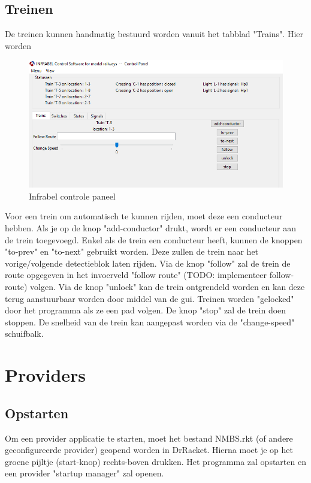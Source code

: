 \documentclass[a4paper, 11pt]{article}
\newcommand{\<}{\scriptsize\textless\normalsize}
\renewcommand{\>}{\scriptsize\textgreater\normalsize}
\begin{document}
\subsection{Treinen} %
De treinen kunnen handmatig bestuurd worden vanuit het tabblad "Trains". Hier worden
\begin{figure}[h]
	\begin{center}
		\includegraphics[scale=.75]{Bestanden/infrabel-train.png}
		\caption{Infrabel controle paneel}
	\end{center}
\end{figure}

Voor een trein om automatisch te kunnen rijden, moet deze een conducteur hebben. Als je op de knop "add-conductor" drukt, wordt er een conducteur aan de trein toegevoegd.
Enkel als de trein een conducteur heeft, kunnen de knoppen "to-prev" en "to-next" gebruikt worden. Deze zullen de trein naar het vorige/volgende detectieblok laten rijden.
Via de knop "follow" zal de trein de route opgegeven in het invoerveld "follow route" (TODO: implementeer follow-route) volgen.
Via de knop "unlock" kan de trein ontgrendeld worden en kan deze terug aanstuurbaar worden door middel van de gui. Treinen worden "gelocked" door het programma als ze een pad volgen.
De knop "stop" zal de trein doen stoppen. De snelheid van de trein kan aangepast worden via de "change-speed" schuifbalk.

\newpage
\section{Providers} %
\subsection{Opstarten} %
Om een provider applicatie te starten, moet het bestand NMBS.rkt (of andere geconfigureerde provider) geopend worden in DrRacket. Hierna moet je op het groene pijltje (start-knop) rechts-boven drukken. Het programma zal opstarten en een provider "startup manager" zal openen.\\
\end{document}

